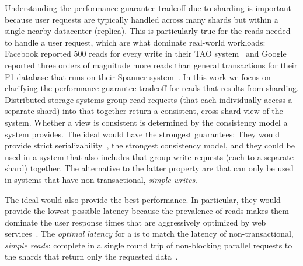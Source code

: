 Understanding the performance-guarantee tradeoff due to sharding is important because user requests are typically handled across many shards but within a single nearby datacenter (replica).
This is particularly true for the reads needed to handle a user request, which are what dominate real-world workloads:
Facebook reported 500 reads for every write in their TAO system~\cite{TAO2013} and
Google reported three orders of magnitude more reads than general transactions for their F1 database that runs on their Spanner system~\cite{Corbett:osdi2012}.
In this work we focus on clarifying the performance-guarantee tradeoff for reads that results from sharding.
Distributed storage systems group read requests (that each individually access a separate shard) into \textit{\rots{}} that together return a consistent, cross-shard view of the system.
Whether a view is consistent is determined by the consistency model a system provides.
The ideal \rots{} would have the strongest guarantees:
They would provide strict serializability~\cite{Papadimitriou79}, the strongest consistency model,
and they could be used in a system that also includes \textit{\wots{}} that group write requests (each to a separate shard) together.
The alternative to the latter property are \rots{} that can only be used in systems that have non-transactional, \textit{simple writes}.

The ideal \rots{} would also provide the best performance.
In particular, they would provide the lowest possible latency because the prevalence of reads makes them dominate the user response times that are aggressively optimized by web services~\cite{latency:shopzilla, latency:amazon,
  latency:search}.
The \textit{optimal latency} for a \rot{} is to match the latency of non-transactional, \textit{simple reads}:
complete in a single round trip of non-blocking parallel requests to the shards that return only the requested data~\cite{SNOW2016}.

